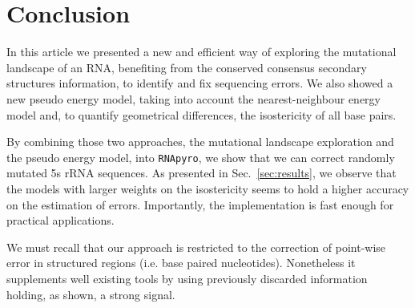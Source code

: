 \section{Conclusion}
\label{sec:conclusion}

In this article we presented a new and efficient way of
exploring the mutational landscape of an RNA, benefiting from the
 conserved consensus secondary structures  information,
to identify and fix sequencing errors. We also showed a new
 pseudo energy model, taking into account the nearest-neighbour energy model 
and, to quantify geometrical differences,  the isostericity of all base pairs. 

By combining those two approaches,  the 
mutational landscape exploration and the pseudo energy model,
 into \texttt{RNApyro}, we show that we can
correct randomly mutated 5s rRNA sequences. 
As presented in Sec.~\ref{sec:results},
we observe that the models
with larger weights on the
isostericity seems to hold a higher accuracy on the estimation of errors.
Importantly, the implementation is fast enough for practical applications. 


We must recall that our approach is restricted to
 the correction of point-wise error in structured regions (i.e. base paired nucleotides).
 Nonetheless it supplements well existing tools by using previously discarded
information holding, as shown, a strong signal.

